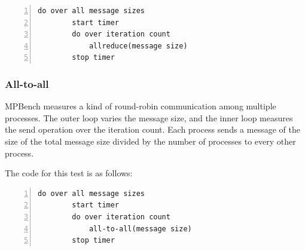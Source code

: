 \begin{minipage}{\textwidth}
\begin{lstlisting}[frame=single,numbers=left]
    do over all message sizes 
        start timer
        do over iteration count 
            allreduce(message size) 
        stop timer
\end{lstlisting}
\end{minipage}

\subsubsection{All-to-all}

MPBench measures a kind of round-robin communication among multiple
processes. The outer loop varies the message size, and the inner loop
measures the send operation over the iteration count. Each process sends a
message of the size of the total message size divided by the number of
processes to every other process.

The code for this test is as follows:

\begin{minipage}{\textwidth}
\end{minipage}

\begin{minipage}{\textwidth}
\begin{lstlisting}[frame=single,numbers=left]
    do over all message sizes 
        start timer
        do over iteration count 
            all-to-all(message size)
        stop timer
\end{lstlisting}
\end{minipage}

\clearpage
